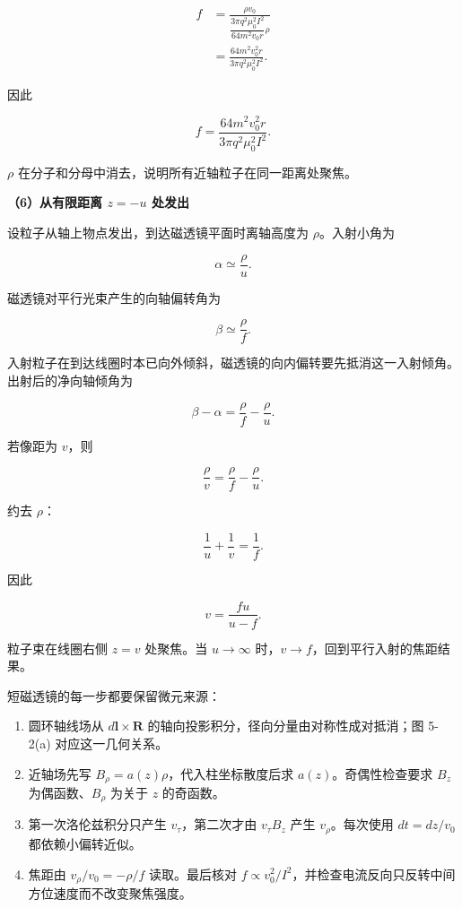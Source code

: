 \documentclass[12pt,a4paper,UTF8]{ctexart}
\newcommand{\tightlist}{\setlength{\itemsep}{0pt}\setlength{\parskip}{0pt}}
\begin{document}
\[
\begin{aligned}
f
&=\frac{\rho v_0}
{\dfrac{3\pi q^2\mu_0^2I^2}{64m^2v_0r}\rho}\\
&=\frac{64m^2v_0^2r}{3\pi q^2\mu_0^2I^2}.
\end{aligned}
\]

因此

\[
\boxed{f=\frac{64m^2v_0^2r}{3\pi q^2\mu_0^2I^2}}.
\]

\(\rho\) 在分子和分母中消去，说明所有近轴粒子在同一距离处聚焦。

\textbf{（6）从有限距离 \(z=-u\) 处发出}

设粒子从轴上物点发出，到达磁透镜平面时离轴高度为 \(\rho\)。入射小角为

\[
\alpha\simeq\frac{\rho}{u}.
\]

磁透镜对平行光束产生的向轴偏转角为

\[
\beta\simeq\frac{\rho}{f}.
\]

入射粒子在到达线圈时本已向外倾斜，磁透镜的向内偏转要先抵消这一入射倾角。出射后的净向轴倾角为

\[
\beta-\alpha
=\frac\rho f-\frac\rho u.
\]

若像距为 \(v\)，则

\[
\frac\rho v=\frac\rho f-\frac\rho u.
\]

约去 \(\rho\)：

\[
\boxed{\frac1u+\frac1v=\frac1f}.
\]

因此

\[
\boxed{v=\frac{fu}{u-f}}.
\]

粒子束在线圈右侧 \(z=v\) 处聚焦。当 \(u\to\infty\)
时，\(v\to f\)，回到平行入射的焦距结果。

短磁透镜的每一步都要保留微元来源：

\begin{enumerate}
\def\labelenumi{\arabic{enumi}.}
\tightlist
\item
  圆环轴线场从 \(d\boldsymbol l\times\boldsymbol R\)
  的轴向投影积分，径向分量由对称性成对抵消；图 5-2(a) 对应这一几何关系。
\item
  近轴场先写 \(B_\rho=a(z)\rho\)，代入柱坐标散度后求
  \(a(z)\)。奇偶性检查要求 \(B_z\) 为偶函数、\(B_\rho\) 为关于 \(z\)
  的奇函数。
\item
  第一次洛伦兹积分只产生 \(v_\tau\)，第二次才由 \(v_\tau B_z\) 产生
  \(v_\rho\)。每次使用 \(dt=dz/v_0\) 都依赖小偏转近似。
\item
  焦距由 \(v_\rho/v_0=-\rho/f\) 读取。最后核对
  \(f\propto v_0^2/I^2\)，并检查电流反向只反转中间方位速度而不改变聚焦强度。
\end{enumerate}
\end{document}
